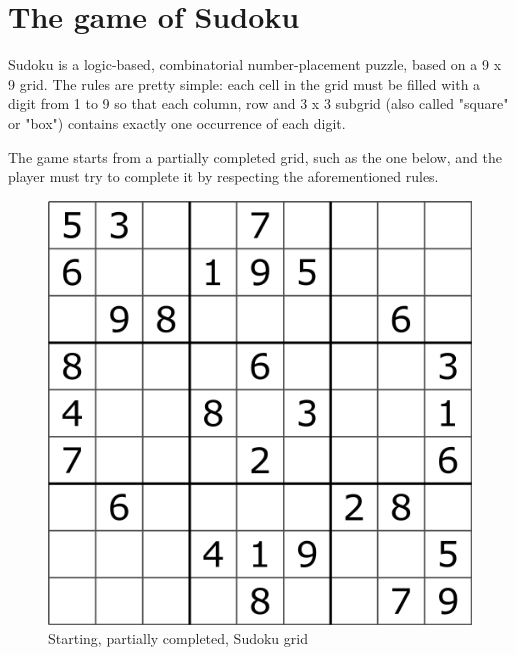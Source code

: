 \chapter{The game of Sudoku}

Sudoku is a logic-based, combinatorial number-placement puzzle, based on a 9 x 9 grid. The rules are pretty simple:
each cell in the grid must be filled with a digit from 1 to 9 so that each column, row and 3 x 3 subgrid (also called "square" or "box") contains exactly one occurrence of each digit.
\par
The game starts from a partially completed grid, such as the one below, and the player must try to complete it by respecting the aforementioned rules.
\par
\begin{figure}[h]
    \centering
    \includegraphics[scale=0.3]{assignment-1/images/sudoku_rules/sudoku-start.png}
    \caption{Starting, partially completed, Sudoku grid}
    \label{fig:sudoku_start}
\end{figure}

